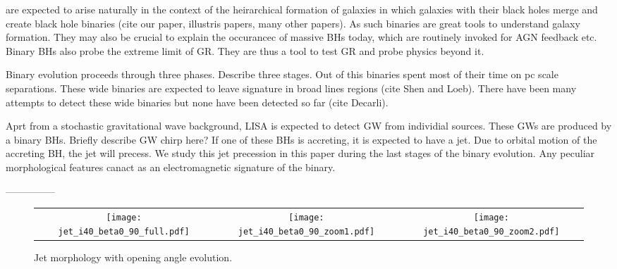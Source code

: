 
are expected to arise naturally in the context of the
heirarchical formation of galaxies in which galaxies with their black
holes merge and create black hole binaries (cite our paper, illustris
papers, many other papers).  As such binaries are great tools to
understand galaxy formation.  They may also be crucial to explain the
occurancec of massive BHs today, which are routinely invoked for AGN
feedback etc.  Binary BHs also probe the extreme limit of GR.  They
are thus a tool to test GR and probe physics beyond it.

Binary evolution proceeds through three phases.  Describe three
stages.  Out of this binaries spent most of their time on pc scale
separations.  These wide binaries are expected to leave signature in
broad lines regions (cite Shen and Loeb).  There have been many
attempts to detect these wide binaries but none have been detected so
far (cite Decarli).

Aprt from a stochastic gravitational wave background, LISA is expected
to detect GW from individial sources.  These GWs are produced by a
binary BHs. Briefly describe GW chirp here?  If one of these BHs is
accreting, it is expected to have a jet.  Due to orbital motion of the
accreting BH, the jet will precess.  We study this jet precession in
this paper during the last stages of the binary evolution.  Any
peculiar morphological features canact as an electromagnetic signature
of the binary.  

---------------

\begin{figure*}
\begin{center}
  \begin{tabular}{ccc}
    \texttt{[image: jet\_i40\_beta0\_90\_full.pdf]} &
    \texttt{[image: jet\_i40\_beta0\_90\_zoom1.pdf]} &
    \texttt{[image: jet\_i40\_beta0\_90\_zoom2.pdf]}
  \end{tabular}
\end{center}
\caption{Jet morphology with opening angle evolution.}
\label{fig:jet_psi}
\end{figure*}

